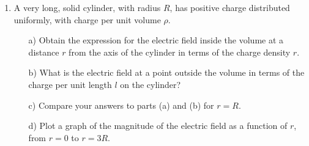 \begin{enumerate}

\item A very long, solid cylinder, with radius $R$, has positive charge distributed uniformly, with charge per unit volume $\rho$.

\begin{itemize}
    \item[a)] Obtain the expression for the electric field inside the volume at a distance $r$ from the axis of the cylinder in terms of the charge density $r$.
    \item[b)] What is the electric field at a point outside the volume in terms of the charge per unit length $l$ on the cylinder?
    \item[c)] Compare your answers to parts (a) and (b) for $r = R$. 
    \item[d)] Plot a graph of the magnitude of the electric field as a function of $r$, from $r = 0$ to $r = 3R$.
\end{itemize}

\end{enumerate}